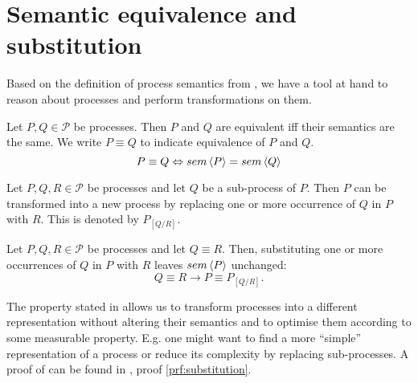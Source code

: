 \clearpage
\section{Semantic equivalence and substitution}
\label{chp:semantic_equivalence}
Based on the definition of process semantics from , we have a tool at hand to reason about processes and perform transformations on them.

\begin{definition}
\label{def:process_equivalence}
Let $P, Q \in \mathcal{P}$ be processes. Then $P$ and $Q$ are equivalent iff their semantics are the same. We write $P \equiv Q$ to indicate equivalence of $P$ and $Q$.
  \begin{equation*}
    \label{eqn:equivalence}
    P \equiv Q \Leftrightarrow sem \left\langle P \right\rangle = sem \left\langle Q \right\rangle
  \end{equation*}
  \hfill\qedsymbol
\end{definition}


\begin{definition}
\label{def:process_substitution}
Let $P, Q, R \in \mathcal{P}$ be processes and let $Q$ be a sub-process of $P$. Then $P$ can be transformed into a new process by replacing one or more occurrence of $Q$ in $P$ with $R$. This is denoted by $P_{\left[ Q / R \right]}$.

\hfill\qedsymbol
\end{definition}


\begin{theorem}
\label{thm:process_substitution}
Let $P, Q, R \in \mathcal{P}$ be processes and let $Q \equiv R$. Then, substituting one or more occurrences of $Q$ in $P$ with $R$ leaves $sem \left\langle P \right\rangle$ unchanged:
  \begin{equation*}
    Q \equiv R \rightarrow P \equiv P_{\left[ Q / R \right]}.
  \end{equation*}
  
  \hfill\qedsymbol
\end{theorem}


The property stated in  allows us to transform processes into a different representation without altering their semantics and to optimise them according to some measurable property. E.g. one might want to find a more \enquote{simple} representation of a process or reduce its complexity by replacing sub-processes. A proof of  can be found in , proof \ref{prf:substitution}.

